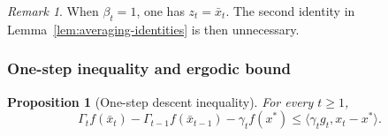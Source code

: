 \documentclass[11pt]{article}
\newtheorem{proposition}[theorem]{Proposition}
\theoremstyle{definition}
\theoremstyle{remark}
\newtheorem{remark}[theorem]{Remark}
\newcommand{\inner}[2]{\langle #1, #2 \rangle}
\begin{document}
\begin{remark}
\label{rem:beta-one}
When $\beta_t=1$, one has $z_t=\bar{x}_t$. The second identity in Lemma~\ref{lem:averaging-identities} is then unnecessary.
\end{remark}

\subsubsection{One-step inequality and ergodic bound}

\begin{proposition}[One-step descent inequality]
\label{prop:one-step}
For every $t\ge 1$,
\[
    \Gamma_t f(\bar{x}_t) - \Gamma_{t-1}f(\bar{x}_{t-1}) - \gamma_t f(x^*)
    \le
    \inner{\gamma_t g_t}{x_t-x^*}.
\]
\end{proposition}
\end{document}
